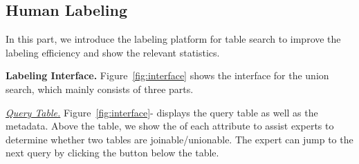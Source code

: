 \subsection{Human Labeling}
In this part, we introduce the labeling  platform for table search to improve the labeling efficiency and show the relevant statistics. 


\noindent \textbf{Labeling Interface.} 
Figure~\ref{fig:interface} shows the interface for the union search, which mainly consists of three parts. 



\noindent \underline{\textit{Query Table.}}  
% 
Figure~\ref{fig:interface}-
displays the query table as well as the metadata. 
Above the table, we show the  of each attribute to assist experts to determine whether two tables are joinable/unionable. The expert can jump to the next query by clicking the button below the table.
%   
%

